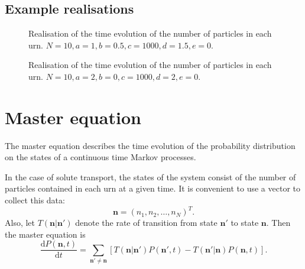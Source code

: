 \documentclass[a4paper,11pt]{article}
\numberwithin{equation}{section}
\newcommand{\diff}[2]{\frac{\mathrm{d} #1}{\mathrm{d} #2}}
\newcommand{\V}[1]{\mathbf{#1}}
\begin{document}
\FloatBarrier

\subsection{Example realisations}

\begin{figure}[ht!]
    \centering
    {
    }

    \caption{\label{fig:exreal1}Realisation of the time evolution of the number
of particles in each urn. \(N=10,a=1,b=0.5,c=1000,d=1.5,e=0\).}
\end{figure}

\begin{figure}[ht!]
    \centering
    {
    }

    \caption{\label{fig:exreal2}Realisation of the time evolution of the number
of particles in each urn. \(N=10,a=2,b=0,c=1000,d=2,e=0\).}
\end{figure}

\FloatBarrier

\section{Master equation}
The master equation describes the time evolution of the probability distribution
on the states of a continuous time Markov processes.

%

In the case of solute transport, the states of the system consist of the number
of particles contained in each urn at a given time. It is convenient to use a
vector to collect this data:
\begin{equation}
    \label{eqn:state_vector}
    \V{n} = \left(n_1,n_2, \dotsc, n_N\right)^{T}.
\end{equation}
Also, let \(T(\V{n}|\V{n}')\) denote the rate of transition from state \(\V{n}'\)
to state \(\V{n}\). Then the master equation is \citep{mckane2012stochastic}
\begin{equation}
    \label{eqn:master_eqn_rates}
    \diff{P(\V{n},t)}{t} = \sum_{\V{n}' \neq \V{n}} \left[ T(\V{n}|\V{n}')
        P(\V{n}',t) - T(\V{n}'|\V{n}) P(\V{n},t) \right].
\end{equation}
\end{document}
